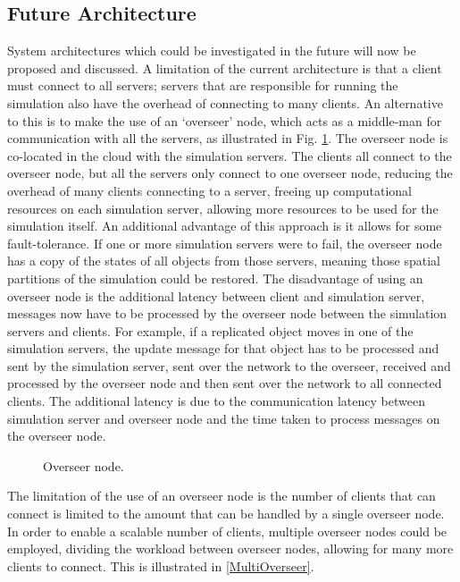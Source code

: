 \subsection{Future Architecture}
System architectures which could be investigated in the future will now be proposed and discussed. A limitation of the current architecture is that a client must connect to all servers; servers that are responsible for running the simulation also have the overhead of connecting to many clients. An alternative to this is to make the use of an `overseer' node, which acts as a middle-man for communication with all the servers, as illustrated in Fig. \ref{OverseerNode}. The overseer node is co-located in the cloud with the simulation servers. The clients all connect to the overseer node, but all the servers only connect to one overseer node, reducing the overhead of many clients connecting to a server, freeing up computational resources on each simulation server, allowing more resources to be used for the simulation itself. An additional advantage of this approach is it allows for some fault-tolerance. If one or more simulation servers were to fail, the overseer node has a copy of the states of all objects from those servers, meaning those spatial partitions of the simulation could be restored. The disadvantage of using an overseer node is the additional latency between client and simulation server, messages now have to be processed by the overseer node between the simulation servers and clients. For example, if a replicated object moves in one of the simulation servers, the update message for that object has to be processed and sent by the simulation server, sent over the network to the overseer, received and processed by the overseer node and then sent over the network to all connected clients. The additional latency is due to the communication latency between simulation server and overseer node and the time taken to process messages on the overseer node.

\begin{figure}
	\centering
	\scalebox{1.25}{}
	\caption{Overseer node.}
	\label{OverseerNode}
\end{figure}

The limitation of the use of an overseer node is the number of clients that can connect is limited to the amount that can be handled by a single overseer node. In order to enable a scalable number of clients, multiple overseer nodes could be employed, dividing the workload between overseer nodes, allowing for many more clients to connect. This is illustrated in \ref{MultiOverseer}.

